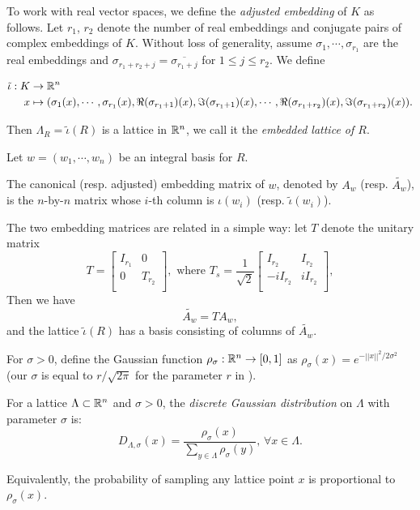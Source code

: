 \documentclass[envcountsect]{llncs}
\begin{document}
To work with real vector spaces, we define the {\it adjusted embedding} of $K$ as follows. Let $r_1$, $r_2$ denote the number of real embeddings and conjugate pairs of complex embeddings of $K$. Without loss of generality, assume $\sigma_1, \cdots, \sigma_{r_1}$ are the real embeddings and $\sigma_{r_1+r_2+j} = \overline{\sigma_{r_1 + j}}$ for $1 \leq j \leq r_2$. We define

\begin{align*}
    \tilde{\iota}: K & \to \mathbb{R}^n \\
    x & \mapsto (\sigma_1(x), \cdots, \sigma_{r_1}(x), \Re(\sigma_{r_1+1})(x), \Im(\sigma_{r_1+1})(x), \cdots,  \Re(\sigma_{r_1+r_2})(x), \Im(\sigma_{r_1+r_2})(x)).
\end{align*}

Then $\Lambda_R = \tilde{\iota}(R)$ is a lattice in $\mathbb{R}^n$, we call it the {\it embedded lattice of $R$}. 

Let $w = (w_1, \cdots , w_n)$ be an integral basis for $R$.

\begin{definition}
The canonical (resp. adjusted) embedding matrix of $w$, denoted by $A_w$ (resp. $\widetilde{A_w}$), is the $n$-by-$n$ matrix whose $i$-th column is $\iota(w_i)$ (resp. $\tilde{\iota}(w_i)$).
\end{definition}

The two embedding matrices are related in a simple way:
let $T$ denote the unitary matrix
\[
T = \begin{bmatrix}
    I_{r_1}  & 0  \\
    0     & T_{r_2} \\
\end{bmatrix},
\mbox{ where } T_s = \frac{1}{\sqrt{2}} \begin{bmatrix}
    I_{r_2}  & I_{r_2} \\
    -iI_{r_2}     & iI_{r_2} \\
\end{bmatrix},
\]
Then we have
$$\widetilde{A_{w}} = T A_{w},$$
and the lattice $\tilde{\iota}(R)$ has a basis consisting of columns of $\widetilde{A_{w}}$.

For $\sigma > 0$, define the Gaussian function $\rho_\sigma: \mathbb{R}^n \to [0,1]$ as $\rho_\sigma(x) = e^{-||x||^2/2\sigma^2}$ (our $\sigma$ is equal to $r/\sqrt{2\pi}$ for the parameter $r$ in \cite{lyubashevsky2013ideal}).
\begin{definition}
For a lattice $\Lambda \subset \mathbb{R}^n$ and $\sigma > 0$, the {\it discrete Gaussian distribution} on $\Lambda$ with parameter $\sigma$ is:
\[
    D_{\Lambda, \sigma}(x) = \frac{\rho_\sigma(x)}{\sum_{y \in\Lambda} \rho_\sigma(y)}, \, \forall x \in \Lambda.
\]
\end{definition}
Equivalently, the probability of sampling any lattice point $x$ is proportional to $\rho_\sigma(x)$.
\end{document}
